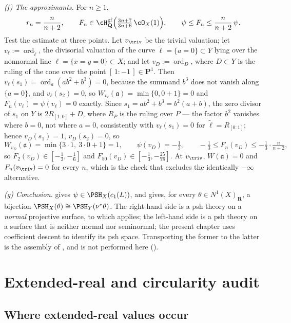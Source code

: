 \begin{example}
\emph{(f) The approximants.}  For $n\ge1$,
\[
 r_n=\frac n{n+2},
 \qquad
 F_n\in\cH^{\mathrm{gf}}_{\mathbf Q}
   \Bigl(\tfrac{3n+7}{3n+6}\,\cO_X(1)\Bigr),
 \qquad
 \psi\le F_n\le\frac n{n+2}\,\psi .
\]
Test the estimate at three points.  Let $v_\triv$ be the trivial
valuation; let $v_\ell:=\operatorname{ord}_{\tilde\ell}$, the divisorial
valuation of the curve $\tilde\ell=\{a=0\}\subset Y$ lying over the
nonnormal line $\ell=\{x=y=0\}\subset X$; and let
$v_D:=\operatorname{ord}_D$, where $D\subset Y$ is the ruling of the
cone over the point $[\,1:-1\,]\in\mathbf P^1$.  Then
$v_\ell(s_1)=\operatorname{ord}_a(ab^2+b^3)=0$, because the summand
$b^3$ does not vanish along $\{a=0\}$, and $v_\ell(s_2)=0$, so
$W_{v_\ell}(\mathfrak a)=\min\{0,0+1\}=0$ and
$F_n(v_\ell)=\psi(v_\ell)=0$ exactly.  Since
$s_1=ab^2+b^3=b^2(a+b)$, the zero divisor of $s_1$ on $Y$ is
$2R_{[1:0]}+D$, where $R_P$ is the ruling over $P$ --- the factor
$b^2$ vanishes where $b=0$, not where $a=0$, consistently with
$v_\ell(s_1)=0$ for $\tilde\ell=R_{[0:1]}$; hence
$v_D(s_1)=1$,
$v_D(s_2)=0$, so
\[
 W_{v_D}(\mathfrak a)=\min\{3\cdot1,\ 3\cdot0+1\}=1,
 \qquad
 \psi(v_D)=-\tfrac13,
 \qquad
 -\tfrac13\le F_n(v_D)\le-\tfrac13\cdot\tfrac n{n+2},
\]
so $F_2(v_D)\in[-\tfrac13,-\tfrac16]$ and
$F_{50}(v_D)\in[-\tfrac13,-\tfrac{25}{78}]$.  At $v_\triv$,
$W(\mathfrak a)=0$ and $F_n(v_\triv)=0$ for every $n$, which is the
check that excludes the identically $-\infty$ alternative.

\emph{(g) Conclusion.}   gives
$\psi\in\PSH_X(c_1(L))$, and
 gives, for every
$\theta\in N^1(X)_{\mathbf R}$, a bijection
$\PSH_X(\theta)\cong\PSH_Y(\nu^*\theta)$.  The right-hand side is a psh
theory on a \emph{normal} projective surface, to which
 applies; the left-hand side is a psh theory on
a surface that is neither normal nor seminormal; the present chapter
uses coefficient descent to identify its psh space.  Transporting the former to the latter is the
assembly of , and is not performed here
().
\end{example}

\section{Extended-real and circularity audit}
\label{sec:ch44-audit}

\subsection{Where extended-real values occur}
\label{sec:ch44-extended-real}

